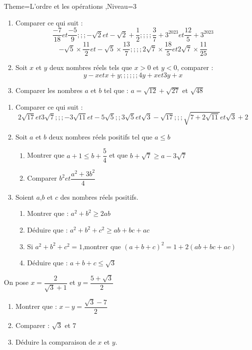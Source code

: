 \documentclass[a4paper,12pt]{article}
\begin{document}
\begin{Maquette}[Fiche]{Theme=L'ordre et les opérations ,Niveau=3}

\begin{exercice}
\begin{enumerate}
\item Comparer ce qui suit :
$$\dfrac{-7}{18} et \dfrac{-5}{9};;;-\sqrt{2} et -\sqrt{2}+\dfrac{1}{2};;;; \dfrac{3}{7}+3^{2023} et \dfrac{12}{5}+3^{2023}  $$
$$-\sqrt{5}\times\dfrac{11}{2}et -\sqrt{5}\times \dfrac{13}{7};;;;2\sqrt{7}\times \dfrac{18}{5}et 2\sqrt{7}\times \dfrac{11}{25} $$
\item Soit $x$ et $y$ deux nombres réels tels que $x>0$ et $y<0$, comparer :
$$y-x et x+y ;;;;;; 4y+x et 3y+x $$
\item Comparer les nombres $a$ et $b$ tel que : $a=\sqrt{12}+\sqrt{27}$ et $\sqrt{48}$
\end{enumerate}
\end{exercice}

\begin{exercice}
\begin{enumerate}
\item Comparer ce qui suit :
$$2\sqrt{17}et3\sqrt{7};;;-3\sqrt{11}et-5\sqrt{5};;3\sqrt{5}et\sqrt{3}-\sqrt{17};;;\sqrt{7+2\sqrt{11}}et\sqrt{3}+2 $$
\item Soit $a$ et $b$ deux nombres réels positifs tel que $a\leq b$
\begin{enumerate}
\item Montrer que $a+1\leq b+\dfrac{5}{4}$ et que $b+\sqrt{7}\geq a-3\sqrt{7}$
\item Comparer $b^{2}et\dfrac{a^{2}+3b^{2}}{4}$
\end{enumerate}
\item Soient $a$,$b$ et $c$ des nombres réels positifs.
\begin{enumerate}
\item Montrer que : $a^{2}+b^{2}\geq 2ab$
\item Déduire que : $a^{2}+b^{2}+c^{2}\geq ab+bc+ac$
\item Si $a^{2}+b^{2}+c^{2}=1$,montrer que $(a+b+c)^{2}=1+2(ab+bc+ac)$
\item Déduire que : $a+b+c\leq \sqrt{3}$
\end{enumerate}
\end{enumerate}
\end{exercice}

\begin{exercice}
On pose $x=\dfrac{2}{\sqrt{3}+1}$ et $y=\dfrac{5+\sqrt{3}}{2}$
\begin{enumerate}
\item Montrer que : $x-y=\dfrac{\sqrt{3}-7}{2}$
\item Comparer : $\sqrt{3}$ et $7$
\item Déduire  la comparaison de $x$ et $y$.
\end{enumerate}
\end{exercice}


\end{Maquette}
\end{document}
